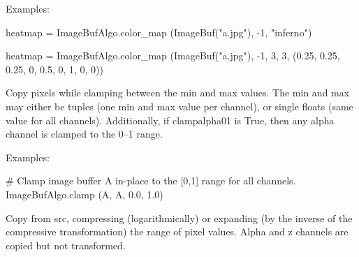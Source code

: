 \smallskip
\noindent Examples:
\begin{code}
    heatmap = ImageBufAlgo.color_map (ImageBuf("a.jpg"), -1, "inferno")

    heatmap = ImageBufAlgo.color_map (ImageBuf("a.jpg"), -1, 3, 3,
                            (0.25, 0.25, 0.25,  0, 0.5, 0,  1, 0, 0))
\end{code}
\apiend


 

Copy pixels while clamping
between the {\cf min} and {\cf max} values.  The {\cf min} and {\cf max}
may either be tuples (one min and max value per channel), or single
{\cf floats} (same value for all channels).  Additionally, if
{\cf clampalpha01} is {\cf True}, then any alpha 
channel is clamped to the 0--1 range.

\smallskip
\noindent Examples:
\begin{code}
    # Clamp image buffer A in-place to the [0,1] range for all channels.
    ImageBufAlgo.clamp (A, A, 0.0, 1.0)
\end{code}
\apiend


 
 

Copy from {\cf src}, compressing (logarithmically) or expanding
(by the inverse of the compressive transformation) the range of pixel
values.  Alpha and z channels are copied but not transformed.

